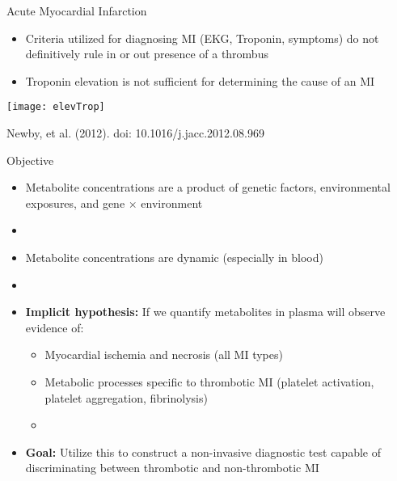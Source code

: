 \documentclass[xcolor=dvipsnames]{beamer}
\begin{document}
\begin{frame}{Acute Myocardial Infarction}
\vspace{-5pt}
\begin{itemize}
\item Criteria utilized for diagnosing MI (EKG, Troponin, symptoms) do not definitively rule in or out presence of a thrombus \pause
\item Troponin elevation is not sufficient for determining the cause of an MI \pause
\end{itemize}
\begin{center}
\texttt{[image: elevTrop]}

Newby, et al. (2012). doi: 10.1016/j.jacc.2012.08.969
\end{center}
\end{frame}

\begin{frame}{Objective}
\vspace{-10pt}
\begin{itemize}
\item Metabolite concentrations are a product of genetic factors, environmental exposures, and gene $\times$ environment \pause
\item[]
\item Metabolite concentrations are dynamic (especially in blood) \pause
\item[]
\item \textbf{Implicit hypothesis:} If we quantify metabolites in plasma will observe evidence of:
\begin{itemize}
\item Myocardial ischemia and necrosis (all MI types)
\item Metabolic processes specific to thrombotic MI (platelet activation, platelet aggregation, fibrinolysis) \pause
\item[]
\end{itemize}
\item \textbf{Goal:} Utilize this to construct a non-invasive diagnostic test capable of discriminating between thrombotic and non-thrombotic MI
\end{itemize}
\end{frame}
\end{document}
